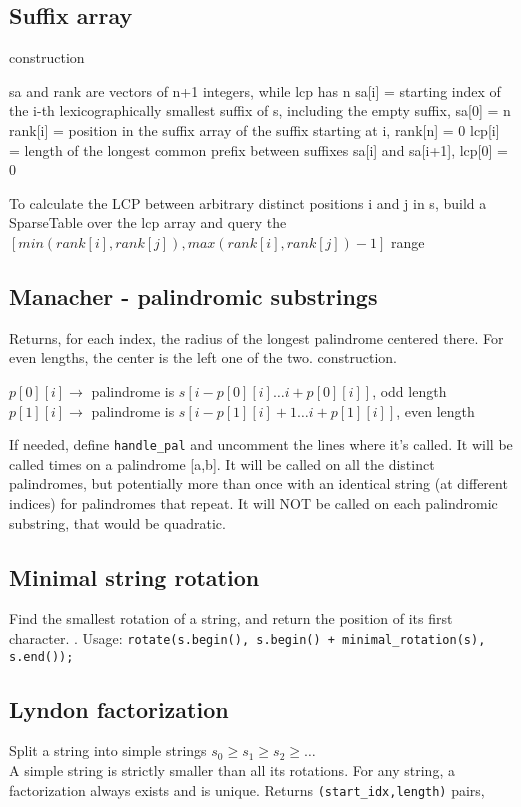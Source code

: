 \subsection{Suffix array}
 construction

sa and rank are vectors of n+1 integers, while lcp has n
sa[i] = starting index of the i-th lexicographically
  smallest suffix of s, including the empty suffix, sa[0] = n
rank[i] = position in the suffix array of the suffix starting at i, rank[n] = 0
lcp[i] = length of the longest common prefix between
  suffixes sa[i] and sa[i+1], lcp[0] = 0

To calculate the LCP between arbitrary distinct positions i and j in s, build a SparseTable over the lcp array and query the $[min(rank[i],rank[j]),max(rank[i],rank[j])-1]$ range


\subsection{Manacher - palindromic substrings}
Returns, for each index, the radius of the longest palindrome centered there. For even lengths, the center is the left one of the two.  construction.

\begin{flushleft}
$p[0][i] \xrightarrow{}$ palindrome is $s[i-p[0][i] \ldots i+p[0][i]]$, odd length \\
$p[1][i] \xrightarrow{}$ palindrome is $s[i-p[1][i]+1 \ldots i+p[1][i]]$, even length
\end{flushleft}

If needed, define \texttt{handle\_pal} and uncomment the lines where it's called. It will be called  times on a palindrome [a,b]. It will be called on all the distinct palindromes, but potentially more than once with an identical string (at different indices) for palindromes that repeat. It will NOT be called on each palindromic substring, that would be quadratic.


\subsection{Minimal string rotation}
Find the smallest rotation of a string, and return the position of its first character. . Usage:
\texttt{rotate(s.begin(), s.begin() + minimal\_rotation(s), s.end());}


\subsection{Lyndon factorization}
Split a string into simple strings $s_0 \geq s_1 \geq s_2 \geq \ldots $\\
A simple string is strictly smaller than all its rotations. For any string, a factorization always exists and is unique. Returns \texttt{(start\_idx,length)} pairs, 


